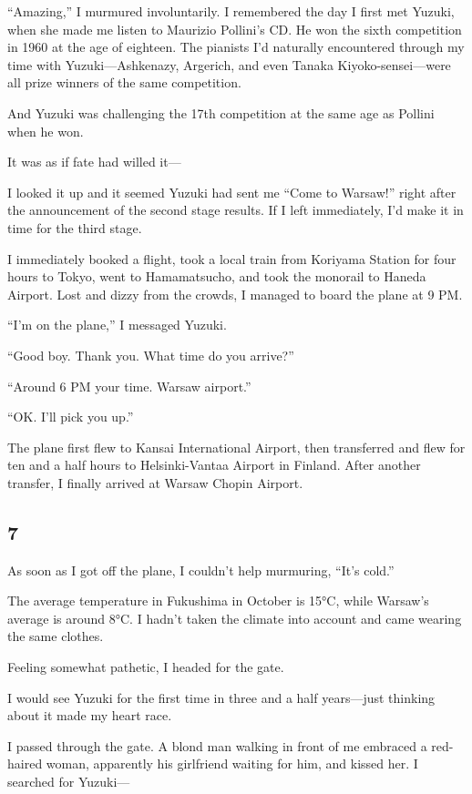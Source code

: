 \documentclass[
    a4paper,
    12pt,
    twoside,
    openany,
    UTF8,
    fontset=windows
]{ctexbook}
\begin{document}
``Amazing,'' I murmured involuntarily. I remembered the day I first met Yuzuki, when she made me listen to Maurizio Pollini's CD. He won the sixth competition in 1960 at the age of eighteen. The pianists I'd naturally encountered through my time with Yuzuki---Ashkenazy, Argerich, and even Tanaka Kiyoko-sensei---were all prize winners of the same competition.

And Yuzuki was challenging the 17th competition at the same age as Pollini when he won.

It was as if fate had willed it---

I looked it up and it seemed Yuzuki had sent me ``Come to Warsaw!'' right after the announcement of the second stage results. If I left immediately, I'd make it in time for the third stage.

I immediately booked a flight, took a local train from Koriyama Station for four hours to Tokyo, went to Hamamatsucho, and took the monorail to Haneda Airport. Lost and dizzy from the crowds, I managed to board the plane at 9 PM.

``I'm on the plane,'' I messaged Yuzuki.

``Good boy. Thank you. What time do you arrive?''

``Around 6 PM your time. Warsaw airport.''

``OK. I'll pick you up.''

The plane first flew to Kansai International Airport, then transferred and flew for ten and a half hours to Helsinki-Vantaa Airport in Finland. After another transfer, I finally arrived at Warsaw Chopin Airport.


\subsection*{7}

As soon as I got off the plane, I couldn't help murmuring, ``It's cold.''

The average temperature in Fukushima in October is 15°C, while Warsaw's average is around 8°C. I hadn't taken the climate into account and came wearing the same clothes.

Feeling somewhat pathetic, I headed for the gate.

I would see Yuzuki for the first time in three and a half years---just thinking about it made my heart race.

I passed through the gate. A blond man walking in front of me embraced a red-haired woman, apparently his girlfriend waiting for him, and kissed her. I searched for Yuzuki---
\end{document}
